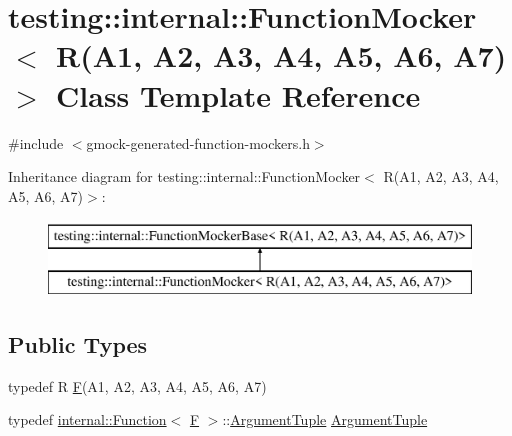 \hypertarget{classtesting_1_1internal_1_1_function_mocker_3_01_r_07_a1_00_01_a2_00_01_a3_00_01_a4_00_01_a5_00_01_a6_00_01_a7_08_4}{}\section{testing\+::internal\+::Function\+Mocker$<$ R(A1, A2, A3, A4, A5, A6, A7)$>$ Class Template Reference}
\label{classtesting_1_1internal_1_1_function_mocker_3_01_r_07_a1_00_01_a2_00_01_a3_00_01_a4_00_01_a5_00_01_a6_00_01_a7_08_4}


{\ttfamily \#include $<$gmock-\/generated-\/function-\/mockers.\+h$>$}

Inheritance diagram for testing\+::internal\+::Function\+Mocker$<$ R(A1, A2, A3, A4, A5, A6, A7)$>$\+:\begin{figure}[H]
\begin{center}
\leavevmode
\includegraphics[height=2.000000cm]{dc/dae/classtesting_1_1internal_1_1_function_mocker_3_01_r_07_a1_00_01_a2_00_01_a3_00_01_a4_00_01_a5_00_01_a6_00_01_a7_08_4}
\end{center}
\end{figure}
\subsection*{Public Types}
\begin{DoxyCompactItemize}
\item 
typedef R \mbox{\hyperlink{classtesting_1_1internal_1_1_function_mocker_3_01_r_07_a1_00_01_a2_00_01_a3_00_01_a4_00_01_a5_00_01_a6_00_01_a7_08_4_a2ea0e33d9cc0d1f57d58b4aee98c117c}{F}}(A1, A2, A3, A4, A5, A6, A7)
\item 
typedef \mbox{\hyperlink{structtesting_1_1internal_1_1_function}{internal\+::\+Function}}$<$ \mbox{\hyperlink{classtesting_1_1internal_1_1_function_mocker_3_01_r_07_a1_00_01_a2_00_01_a3_00_01_a4_00_01_a5_00_01_a6_00_01_a7_08_4_a2ea0e33d9cc0d1f57d58b4aee98c117c}{F}} $>$\+::\mbox{\hyperlink{classtesting_1_1internal_1_1_function_mocker_3_01_r_07_a1_00_01_a2_00_01_a3_00_01_a4_00_01_a5_00_01_a6_00_01_a7_08_4_a313911b9c80b57c8c25f0ad5ef2d0bdc}{Argument\+Tuple}} \mbox{\hyperlink{classtesting_1_1internal_1_1_function_mocker_3_01_r_07_a1_00_01_a2_00_01_a3_00_01_a4_00_01_a5_00_01_a6_00_01_a7_08_4_a313911b9c80b57c8c25f0ad5ef2d0bdc}{Argument\+Tuple}}
\end{DoxyCompactItemize}
